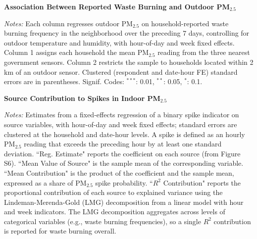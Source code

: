 \documentclass[9pt,twoside]{pnas-new}
\begin{document}
\begin{adjustwidth}{1cm}{1cm}
\newpage

\begin{table}[!h] %
    \centering

    \caption{\textbf{Association Between Reported Waste Burning and Outdoor PM$_{2.5}$}}
    \label{tab:waste}
    \begin{adjustbox}{max width=.7\textwidth}
    \small
    
    \end{adjustbox}
    \caption*{\footnotesize \textit{Notes:}  Each column regresses outdoor PM$_{2.5}$ on household-reported waste burning frequency in the neighborhood over the preceding 7 days, controlling for outdoor temperature and humidity, with hour-of-day and week fixed effects. Column 1 assigns each household the mean PM$_{2.5}$ reading from the three nearest government sensors. Column 2 restricts the sample to households located within 2 km of an outdoor sensor. Clustered (respondent and date-hour FE) standard errors are in parentheses. Signif. Codes: $^{***}$: 0.01, $^{**}$: 0.05, $^{*}$: 0.1.}
\end{table}

\newpage

\begin{table}[!h] %
    \centering

    \caption{\textbf{Source Contribution to Spikes in Indoor PM$_{2.5}$}}
    \label{tab:spike_source}
    \begin{adjustbox}{max width=\textwidth}
    \small
    
    \end{adjustbox}
    \caption*{\footnotesize \textit{Notes:} Estimates  from a fixed-effects regression of a binary spike indicator on source variables, with hour-of-day and week fixed effects; standard errors are clustered at the household and date-hour levels. A spike is defined as an hourly PM$_{2.5}$ reading that exceeds the preceding hour by at least one standard deviation.  ``Reg. Estimate" reports the coefficient on each source (from Figure S6). ``Mean Value of Source" is the sample mean of the corresponding variable. ``Mean Contribution" is the product of the coefficient and the sample mean, expressed as a share of PM$_{2.5}$ spike probability. ``$R^2$ Contribution" reports the proportional contribution of each source to explained variance using the Lindeman-Merenda-Gold (LMG) decomposition from a linear model with hour and week indicators. The LMG decomposition aggregates across levels of categorical variables (e.g., waste burning frequencies), so a single $R^2$ contribution is reported for waste burning overall.}
\end{table}


\end{adjustwidth}
\end{document}
